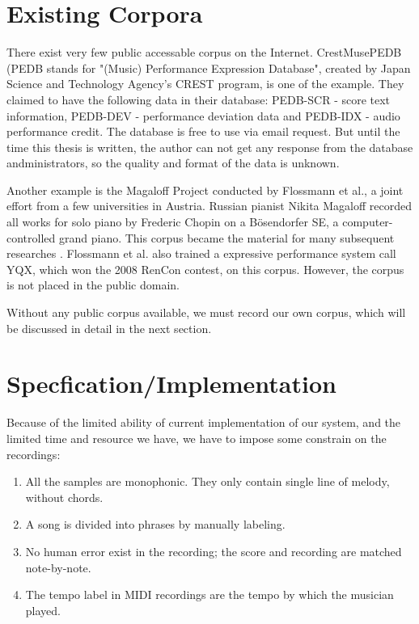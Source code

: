 \section{Existing Corpora} 
There exist very few public accessable corpus on the Internet. CrestMusePEDB\cite{crestmuse} (PEDB stands for "(Music) Performance Expression Database", created by Japan Science and Technology Agency's CREST program, is one of the example. They claimed to have the following data in their database: PEDB-SCR - score text information, PEDB-DEV - performance deviation data and PEDB-IDX - audio performance credit. The database is free to use via email request. But until the time this thesis is written, the author can not get any response from the database andministrators, so the quality and format of the data is unknown.

Another example is the Magaloff Project\cite{magaloff} conducted by Flossmann et al., a joint effort from a few universities in Austria.  Russian pianist Nikita Magaloff recorded all works for solo piano by Frederic Chopin on a Bösendorfer SE, a computer-controlled grand piano. This corpus became the material for many subsequent researches \cite{magaloff extendedi}. Flossmann et al. also trained a expressive performance system call YQX\cite{yqx}, which won the 2008 RenCon contest, on this corpus. However, the corpus is not placed in the public domain. 

Without any public corpus available, we must record our own corpus, which will be discussed in detail in the next section.

\section{Specfication/Implementation}

Because of the limited ability of current implementation of our system, and the limited time and resource we have, we have to impose some constrain on the recordings:
\begin{enumerate}
   \item All the samples are monophonic. They only contain single line of melody, without chords.
   \item A song is divided into phrases by manually labeling.
   \item No human error exist in the recording; the score and recording are matched note-by-note.
   \item The tempo label in MIDI recordings are the tempo by which the musician played. 
\end{enumerate}


